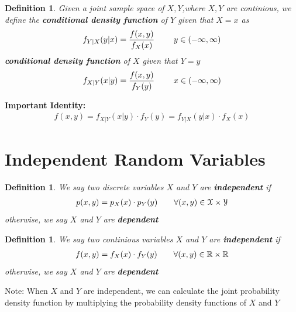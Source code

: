 \documentclass[11pt,oneside]{book}
\theoremstyle{newStyle}
\newtheorem{defn}[thm]{Definition}
\newcommand{\R}{\mathbb{R}}
\newcommand{\note}{\color{red}Note: \color{black}}
\begin{document}
\begin{defn}
Given a joint sample space of $X,Y$,where $X,Y$ are continious, we define the \textbf{conditional density function} of $Y$ given that $X=x$ as \begin{align*}
f_{Y|X}(y|x)=\frac{f(x,y)}{f_X(x)} \text{ \qquad}y\in (-\infty,\infty)
\end{align*}
 \textbf{conditional density function} of $X$ given that $Y=y$ \begin{align*}
f_{X|Y}(x|y)=\frac{f(x,y)}{f_Y(y)} \text{ \qquad}x\in (-\infty,\infty)
\end{align*}
\end{defn}
\textbf{Important Identity:} \begin{align*}
f(x,y)=f_{X|Y}(x|y)\cdot f_Y(y)=f_{Y|X}(y|x)\cdot f_X(x)
\end{align*}
\section[Independent Random Variables]{Independent Random Variables}
\begin{defn}
We say two discrete variables $X$ and $Y$ are \textbf{independent} if \begin{align*}
p(x,y)=p_X(x)\cdot p_Y(y) \text{\qquad}\forall (x,y)\in \mathcal{X}\times \mathcal{Y}
\end{align*}
otherwise, we say $X$ and $Y$ are \textbf{dependent}
\end{defn}
\begin{defn}
We say two continious variables $X$ and $Y$ are \textbf{independent} if \begin{align*}
f(x,y)=f_X(x)\cdot f_Y(y) \text{\qquad}\forall (x,y)\in \R\times \R
\end{align*}
otherwise, we say $X$ and $Y$ are \textbf{dependent}
\end{defn}
\note When $X$ and $Y$ are independent, we can calculate the joint probability density function by multiplying the probability density functions of $X$ and $Y$
\end{document}
